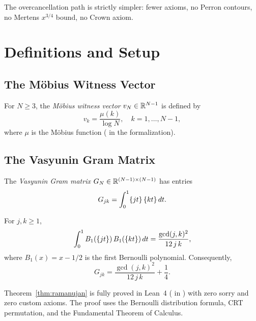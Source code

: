 \documentclass[11pt,a4paper]{article}
\begin{document}
\noindent
The overcancellation path is strictly simpler: fewer axioms, no
Perron contours, no Mertens $x^{3/4}$ bound, no Crown axiom.

\section{Definitions and Setup}
\label{sec:setup}

\subsection{The M\"obius Witness Vector}

\begin{definition}
\label{def:witness}
For $N \geq 3$, the \emph{M\"obius witness vector}
$v_N \in \mathbb{R}^{N-1}$ is defined by
\[
  v_k = \frac{\mu(k)}{\log N}, \quad k = 1, \ldots, N-1,
\]
where $\mu$ is the M\"obius function ( in
the formalization).
\end{definition}

\subsection{The Vasyunin Gram Matrix}

\begin{definition}
\label{def:gram}
The \emph{Vasyunin Gram matrix} $G_N \in \mathbb{R}^{(N-1) \times (N-1)}$
has entries
\[
  G_{jk} = \int_0^1 \{jt\}\,\{kt\}\,dt.
\]
\end{definition}

\begin{theorem}
\label{thm:ramanujan}
For $j, k \geq 1$,
\[
  \int_0^1 B_1(\{jt\})\,B_1(\{kt\})\,dt
  = \frac{\gcd(j,k)^2}{12\,j\,k},
\]
where $B_1(x) = x - 1/2$ is the first Bernoulli polynomial.
Consequently,
\[
  G_{jk} = \frac{\gcd(j,k)^2}{12\,j\,k} + \frac{1}{4}.
\]
\end{theorem}

\begin{remark}
Theorem~\ref{thm:ramanujan} is fully proved in Lean~4
( in
) with zero sorry and zero
custom axioms. The proof uses the Bernoulli distribution formula,
CRT permutation, and the Fundamental Theorem of Calculus.
\end{remark}
\end{document}

